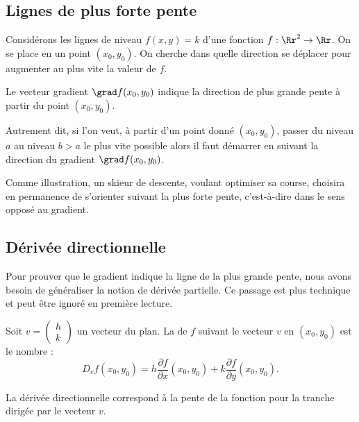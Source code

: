 \documentclass[11pt,class=report,crop=false]{standalone}
\begin{document}
\subsection{Lignes de plus forte pente}
 
Considérons les lignes de niveau $f(x,y)=k$ d'une fonction $f : \Rr^2 \to \Rr$.
On se place en un point $(x_0,y_0)$. On cherche dans quelle direction se déplacer pour augmenter au plus vite la valeur de $f$.
 
\begin{proposition}
Le vecteur gradient $\grad f(x_0,y_0)$ indique la direction de plus grande pente à partir du point $(x_0,y_0)$.
\end{proposition}


Autrement dit, si l'on veut, à partir d'un point donné $(x_0,y_0)$, passer du niveau $a$ au niveau $b>a$ le plus vite possible alors il faut démarrer en suivant la direction du gradient $\grad f(x_0,y_0)$. 


Comme illustration, un skieur de descente, voulant optimiser sa course, choisira en permanence de s'orienter suivant la plus forte pente, c'est-à-dire dans le sens opposé au gradient. 
 
\subsection{Dérivée directionnelle}
 
Pour prouver que le gradient indique la ligne de la plus grande pente, nous avons besoin de généraliser la notion de dérivée partielle. Ce passage est plus technique et peut être ignoré en première lecture.

Soit $v=\left(\begin{smallmatrix}h\\k\end{smallmatrix}\right)$ un vecteur du plan.
La  de $f$ suivant le vecteur $v$ en $(x_0,y_0)$ est le nombre :
$$D_v f(x_0,y_0) = h\frac{\partial f}{\partial x}(x_0,y_0)
 +k\frac{\partial f}{\partial y}(x_0,y_0).$$
 
 
La dérivée directionnelle correspond à la pente de la fonction pour la tranche dirigée par le vecteur $v$.

 
\end{document}
